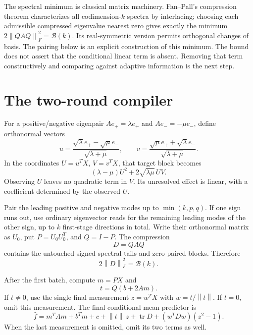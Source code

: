 \documentclass[11pt,a4paper]{article}
\newcommand{\tr}{\operatorname{tr}}\newcommand{\rank}{\operatorname{rank}}
\newcommand{\norm}[1]{\left\lVert#1\right\rVert}
\begin{document}
The spectral minimum is classical matrix machinery. Fan--Pall's compression theorem \cite{fanpall} characterizes all codimension-$k$ spectra by interlacing; choosing each admissible compressed eigenvalue nearest zero gives exactly the minimum $2\norm{QAQ}_F^2=\mathcal B(k)$. Its real-symmetric version permits orthogonal changes of basis. The pairing below is an explicit construction of this minimum. The bound does not assert that the conditional linear term is absent. Removing that term constructively and comparing against adaptive information is the next step.

\section{The two-round compiler}

For a positive/negative eigenpair $Ae_+=\lambda e_+$ and $Ae_-=-\mu e_-$, define orthonormal vectors
\[
 u=\frac{\sqrt\lambda e_+-\sqrt\mu e_-}{\sqrt{\lambda+\mu}},
 \qquad
 v=\frac{\sqrt\mu e_++\sqrt\lambda e_-}{\sqrt{\lambda+\mu}}. \tag{3}
\]
In the coordinates $U=u^TX$, $V=v^TX$, that target block becomes
\[
 (\lambda-\mu)U^2+2\sqrt{\lambda\mu}\,UV. \tag{4}
\]
Observing $U$ leaves no quadratic term in $V$. Its unresolved effect is linear, with a coefficient determined by the observed $U$.

Pair the leading positive and negative modes up to $\min(k,p,q)$. If one sign runs out, use ordinary eigenvector reads for the remaining leading modes of the other sign, up to $k$ first-stage directions in total. Write their orthonormal matrix as $U_0$, put $P=U_0U_0^T$, and $Q=I-P$. The compression
\[
 D=QAQ
\]
contains the untouched signed spectral tails and zero paired blocks. Therefore
\[
 2\norm D_F^2=\mathcal B(k). \tag{5}
\]

After the first batch, compute $m=PX$ and
\[
 t=Q(b+2Am).
\]
If $t\ne0$, use the single final measurement $z=w^TX$ with $w=t/\norm t$. If $t=0$, omit this measurement. The final conditional-mean predictor is
\[
 \widehat f=m^TAm+b^Tm+c+\norm t\,z+\tr D
             +(w^TDw)(z^2-1). \tag{6}
\]
When the last measurement is omitted, omit its two terms as well.
\end{document}

